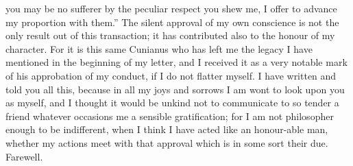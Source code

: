 you may be no sufferer by the peculiar respect you shew me, I offer to
advance my proportion with them.'' The silent approval of my own conscience
is not the only result out of this transaction; it has contributed also to
the honour of my character. For it is this same Cunianus who has left me
the legacy I have mentioned in the beginning of my letter, and I received
it as a very notable mark of his approbation of my conduct, if I do not
flatter myself. I have written and told you all this, because in all my
joys and sorrows I am wont to look upon you as myself, and I thought it
would be unkind not to communicate to so tender a friend whatever
occasions me a sensible gratification; for I am not philosopher enough to
be indifferent, when I think I have acted like an honour-able man, whether
my actions meet with that approval which is in some sort their due.
Farewell.


